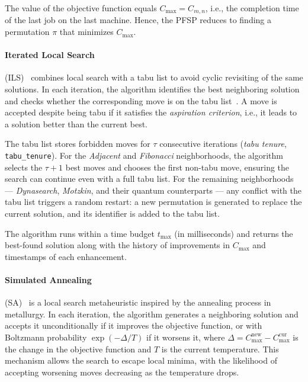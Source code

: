 \documentclass[10pt,twoside,twocolumn,a4paper]{article}
\begin{document}
The value of the objective function equals $C_{\max} = C_{m,n}$, i.e., the completion time of the last job on the last machine. Hence, the PFSP reduces to finding a permutation $\pi$ that minimizes $C_{\max}$.


\paragraph{Iterated Local Search}(ILS)~\cite{lourenco2003iterated} combines local search with a tabu list to avoid cyclic revisiting of the same solutions. In each iteration, the algorithm identifies the best neighboring solution and checks whether the corresponding move is on the tabu list~\cite{glover1989tabu}. A move is accepted despite being tabu if it satisfies the \emph{aspiration criterion}, i.e., it leads to a solution better than the current best.

The tabu list stores forbidden moves for $\tau$ consecutive iterations (\emph{tabu tenure}, \texttt{tabu\_tenure}). For the \emph{Adjacent} and \emph{Fibonacci} neighborhoods, the algorithm selects the $\tau + 1$ best moves and chooses the first non-tabu move, ensuring the search can continue even with a full tabu list. For the remaining neighborhoods --- \emph{Dynasearch}, \emph{Motzkin}, and their quantum counterparts --- any conflict with the tabu list triggers a random restart: a new permutation is generated to replace the current solution, and its identifier is added to the tabu list.

The algorithm runs within a time budget $t_{\max}$ (in milliseconds) and returns the best-found solution along with the history of improvements in $C_{\max}$ and timestamps of each enhancement.


\paragraph{Simulated Annealing}(SA)~\cite{kirkpatrick1983optimization} is a local search metaheuristic inspired by the annealing process in metallurgy. In each iteration, the algorithm generates a neighboring solution and accepts it unconditionally if it improves the objective function, or with Boltzmann probability $\exp(-\Delta/T)$ if it worsens it, where $\Delta = C_{\max}^{\text{new}} - C_{\max}^{\text{cur}}$ is the change in the objective function and $T$ is the current temperature. This mechanism allows the search to escape local minima, with the likelihood of accepting worsening moves decreasing as the temperature drops.
\end{document}

